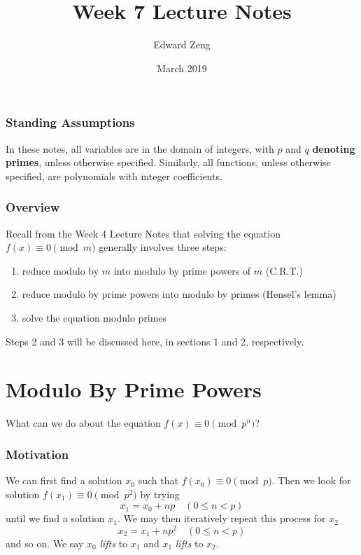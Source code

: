 \documentclass{article}
\title{Week 7 Lecture Notes}
\author{Edward Zeng}
\date{March 2019}
\begin{document}
\maketitle

\subsubsection{Standing Assumptions}
In these notes, all variables are in the domain of integers, with $p$ and $q$ \textbf{denoting primes}, unless otherwise specified. Similarly, all functions, unless otherwise specified, are polynomials with integer coefficients.

\subsubsection{Overview}
Recall from the Week 4 Lecture Notes that solving the equation $f(x) \equiv 0 \pmod{m}$ generally involves three steps:
\begin{enumerate}
    \item reduce modulo by $m$ into modulo by prime powers of $m$ (C.R.T.)
    \item reduce modulo by prime powers into modulo by primes (Hensel's lemma)
    \item solve the equation modulo primes
\end{enumerate}
Steps 2 and 3 will be discussed here, in sections 1 and 2, respectively.

\section{Modulo By Prime Powers}
What can we do about the equation $f(x) \equiv 0 \pmod{p^{n}}$?

\subsubsection{Motivation}
We can first find a solution $x_{0}$ such that $f(x_{0}) \equiv 0 \pmod{p}$. Then we look for solution $f(x_{1}) \equiv 0 \pmod{p^2}$ by trying
\begin{equation}
    x_{1} = x_{0} + np \quad (0 \leq n < p)
\end{equation}
until we find a solution $x_{1}$. We may then iteratively repeat this process for $x_{2}$
\begin{equation}
    x_{2} = x_{1} + np^{2} \quad (0 \leq n < p)
\end{equation}
and so on. We say $x_{0}$ \textit{lifts} to $x_{1}$ and $x_{1}$ \textit{lifts} to $x_{2}$.
\end{document}
